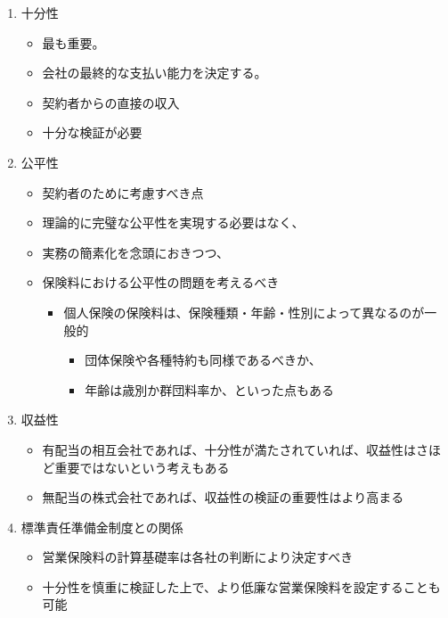 \documentclass[]{article}
\begin{document}
\begin{enumerate}
\def\labelenumi{\arabic{enumi}.}
\tightlist
\item
  十分性

  \begin{itemize}
  \tightlist
  \item
    最も重要。
  \item
    会社の最終的な支払い能力を決定する。
  \item
    契約者からの直接の収入
  \item
    十分な検証が必要
  \end{itemize}
\item
  公平性

  \begin{itemize}
  \tightlist
  \item
    契約者のために考慮すべき点
  \item
    理論的に完璧な公平性を実現する必要はなく、
  \item
    実務の簡素化を念頭におきつつ、
  \item
    保険料における公平性の問題を考えるべき

    \begin{itemize}
    \tightlist
    \item
      個人保険の保険料は、保険種類・年齢・性別によって異なるのが一般的

      \begin{itemize}
      \tightlist
      \item
        団体保険や各種特約も同様であるべきか、
      \item
        年齢は歳別か群団料率か、といった点もある
      \end{itemize}
    \end{itemize}
  \end{itemize}
\item
  収益性

  \begin{itemize}
  \tightlist
  \item
    有配当の相互会社であれば、十分性が満たされていれば、収益性はさほど重要ではないという考えもある
  \item
    無配当の株式会社であれば、収益性の検証の重要性はより高まる
  \end{itemize}
\item
  標準責任準備金制度との関係

  \begin{itemize}
  \tightlist
  \item
    営業保険料の計算基礎率は各社の判断により決定すべき
  \item
    十分性を慎重に検証した上で、より低廉な営業保険料を設定することも可能


\end{itemize}
\end{enumerate}
\end{document}
